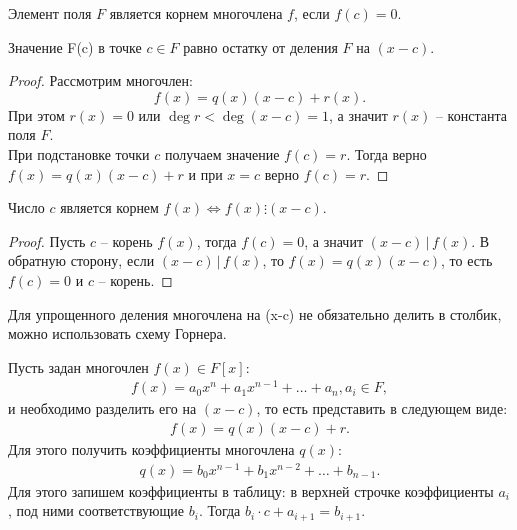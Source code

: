 \begin{definition}
    Элемент поля $F$ является корнем многочлена $f$, если $f(c) = 0$.
\end{definition}

\begin{proposition}
    Значение F(c) в точке $c \in F$ равно остатку от деления $F$ на $(x-c)$.
\end{proposition}

\begin{proof}
    Рассмотрим многочлен: $$f(x) = q(x)(x-c) + r(x).$$ 
    При этом $r(x) = 0$ или $\deg r < \deg(x-c) = 1$, а значит $r(x)$ -- константа поля $F$. 
\\
    При подстановке точки $c$ получаем значение $f(c) = r$. Тогда верно $f(x) = q(x)(x-c) + r$ и при $x = c$ 
    верно $f(c) = r$.
\end{proof}

\begin{theorem}[Безу]
    \label{th1.2}
    Число $c$ является корнем $f(x) \Leftrightarrow f(x) \vdots (x-c)$.
\end{theorem}

\begin{proof}
    Пусть $c$ -- корень $f(x)$, тогда $f(c) = 0$, а значит $(x-c) \, \vert \, f(x)$. В обратную сторону, 
    если $(x-c) \, \vert \, f(x)$, то $f(x) = q(x)(x-c)$, то есть $f(c) = 0$ и $c$ -- корень.
\end{proof}

\begin{note}
    Для упрощенного деления многочлена на (x-c) не обязательно делить в столбик, можно использовать 
    схему Горнера.
\end{note}

\begin{theorem}
    Пусть задан многочлен $f(x) \in F[x]$: 
    \begin{gather*}
        f(x) = a_0 x^n + a_{1} x^{n-1} + \dots + a_n, a_i \in F,
    \end{gather*}
    и необходимо разделить его на $(x-c)$, то есть представить в следующем виде:
    \begin{gather*}
        f(x) = q(x)(x-c) + r.
    \end{gather*}
    Для этого получить коэффициенты многочлена $q(x)$:
    \begin{gather*}
        q(x) = b_0 x^{n-1} + b_1 x^{n-2} + \dots + b_{n-1}.
    \end{gather*}
    Для этого запишем коэффициенты в таблицу: в верхней строчке коэффициенты $a_i$, под ними 
    соответствующие $b_i$. Тогда $b_i \cdot c + a_{i+1} = b_{i+1}$.
\end{theorem}

